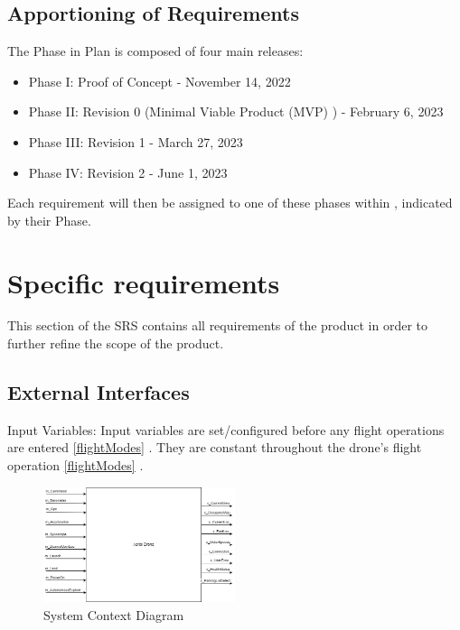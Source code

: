 \documentclass{article}
\begin{document}
\subsection{Apportioning of Requirements}
The Phase in Plan is composed of four main releases:  
\begin{itemize}
    \item Phase I: Proof of Concept - November 14, 2022
    \item Phase II: Revision 0 (Minimal Viable Product (MVP) ) - February 6, 2023 
    \item Phase III: Revision 1 - March 27, 2023
    \item Phase IV: Revision 2 - June 1, 2023
\end{itemize}
Each requirement will then be assigned to one of these phases within , indicated by their Phase. 

\section{Specific requirements }
\label{sec:Req}
This section of the SRS contains all requirements of the product in order to further refine the scope of the product.

\subsection{External Interfaces}
Input Variables: Input variables are set/configured before any flight operations are entered \ref{flightModes} . They are constant throughout the drone's flight operation \ref{flightModes} .


\begin{figure}[!h]
  \begin{center} 
  \caption{System Context Diagram} 
 
        \includegraphics[width=0.5\textwidth]{ContextDiagram.png}
  \end{center}
\end{figure}
\end{document}
